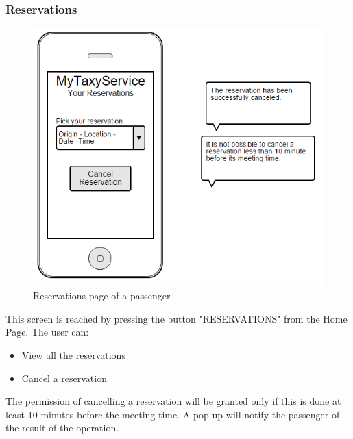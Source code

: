 \subsubsection{Reservations}
\begin{figure}[H]
	\centering
	\includegraphics[scale=0.6]{Images/reservations}
	\caption{Reservations page of a passenger}
\end{figure}
This screen is reached by pressing the button "RESERVATIONS" from the Home Page. The user can:
\begin{itemize}
	\item View all the reservations
	\item Cancel a reservation
\end{itemize}
The permission of cancelling a reservation will be granted only if this is done at least 10 minutes before the meeting time. A pop-up will notify the passenger of the result of the operation.

